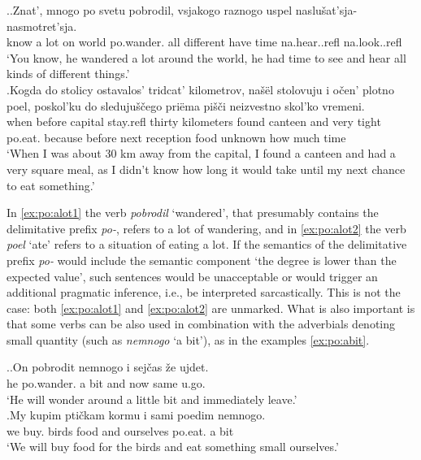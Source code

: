 \ex.\label{ex:po:alot}\ag.\label{ex:po:alot1}Znat', mnogo po svetu pobrodil, vsjakogo raznogo uspel {naslu\v{s}at'sja-} {nasmotret'sja.}\\
know {a lot} on world po.wander. all different {have time} na.hear..refl na.look..refl\\
\trans `You know, he wandered a lot around the world, he had time to see and hear all kinds of different things.'\\
\bg.\label{ex:po:alot2}Kogda do stolicy ostavalos' tridcat' kilometrov, na\v{s}\"{e}l stolovuju i o\v{c}en' plotno poel, poskol'ku do sleduju\v{s}\v{c}ego pri\"{e}ma pi\v{s}\v{c}i neizvestno skol'ko vremeni.\\
when before capital stay.refl thirty kilometers found canteen and very tight po.eat. because before next reception food unknown {how much} time\\
\trans `When I was about 30 km away from the capital, I found a canteen and had a very square meal, as I didn't know how long it would take until my next chance to eat something.'\\

In \ref{ex:po:alot1} the verb \textit{pobrodil} `wandered', that presumably contains the delimitative prefix \textit{po-}, refers to a lot of wandering, and in \ref{ex:po:alot2} the verb \textit{poel} `ate' refers to a situation of eating a lot. If the semantics of the delimitative prefix \textit{po-} would include the semantic component `the degree is lower than the expected value', such sentences would be unacceptable or would trigger an additional pragmatic inference, i.e., be interpreted sarcastically. This is not the case: both \ref{ex:po:alot1} and \ref{ex:po:alot2} are unmarked. What is also important is that some verbs can be also used in combination with the adverbials denoting small quantity (such as \textit{nemnogo} `a bit'), as in the examples \ref{ex:po:abit}.

\ex.\label{ex:po:abit}\ag.On pobrodit nemnogo i sej\v{c}as \v{z}e ujdet.\\
he po.wander. {a bit} and now same u.go.\\
\trans `He will wonder around a little bit and immediately leave.'\\
\bg.My kupim pti\v{c}kam kormu i sami poedim nemnogo.\\
we buy. birds food and ourselves po.eat. {a bit}\\
\trans `We will buy food for the birds and eat something small ourselves.'\\

